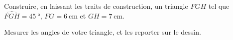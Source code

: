 
\begin{exercice}\label{exosmath-0886}

    Construire, en laissant les traits de construction, un triangle \( FGH\) tel que \( \widehat{FGH}=\SI{45}{\degree}\), \( FG=\SI{6}{\centi\meter}\) et \( GH=\SI{7}{\centi\meter}\).

    Mesurer les angles de votre triangle, et les reporter sur le dessin.

\end{exercice}
